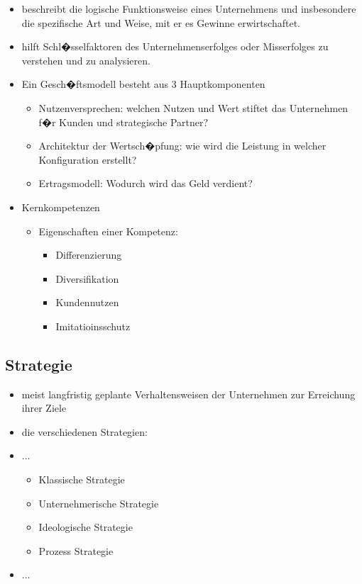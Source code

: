 \begin{itemize}
	\item beschreibt die logische Funktionsweise eines Unternehmens und insbesondere die spezifische Art und Weise, mit er es Gewinne erwirtschaftet.

	\item hilft Schl�sselfaktoren des Unternehmenserfolges oder Misserfolges zu verstehen und zu analysieren.

    \item Ein Gesch�ftsmodell besteht aus 3 Hauptkomponenten
    \begin{itemize}
    	\item Nutzenversprechen: welchen Nutzen und Wert stiftet das Unternehmen f�r Kunden und strategische Partner?
        \item Architektur der Wertsch�pfung: wie wird die Leistung in welcher Konfiguration erstellt? 
        \item Ertragsmodell: Wodurch wird das Geld verdient?
    \end{itemize}
    
    
    \item Kernkompetenzen
    \begin{itemize}
    	\item Eigenschaften einer Kompetenz:
        
        \begin{itemize}
            \item Differenzierung
            \item Diversifikation
            \item Kundennutzen
            \item Imitatioinsschutz
        \end{itemize}
    \end{itemize}


\end{itemize}



\subsection{Strategie}


\begin{itemize}
    \item meist langfristig geplante Verhaltensweisen der Unternehmen zur Erreichung ihrer Ziele
	\item die verschiedenen Strategien:
    \item ...
    \begin{itemize}
    	\item Klassische Strategie
        \item Unternehmerische Strategie
        \item Ideologische Strategie
        \item Prozess Strategie
	\end{itemize}
    
    \item ...
    
\end{itemize}


